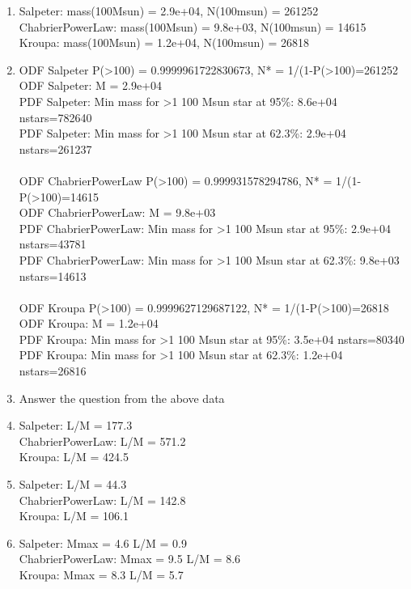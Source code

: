 \documentclass[twoside]{tufte-book} %
\begin{document}
\begin{enumerate}
\begin{enumerate}
\item %

Salpeter: mass(100Msun) = 2.9e+04, N(100msun) = 261252 \\ 
ChabrierPowerLaw: mass(100Msun) = 9.8e+03, N(100msun) = 14615 \\ 
Kroupa: mass(100Msun) = 1.2e+04, N(100msun) = 26818


\item %

ODF Salpeter P(>100) = 0.9999961722830673, N* = 1/(1-P(>100)=261252\\
ODF Salpeter: M = 2.9e+04\\
PDF Salpeter: Min mass for >1 100 Msun star at 95\%: 8.6e+04 nstars=782640\\
PDF Salpeter: Min mass for >1 100 Msun star at 62.3\%: 2.9e+04 nstars=261237\\
\\
ODF ChabrierPowerLaw P(>100) = 0.999931578294786, N* = 1/(1-P(>100)=14615\\
ODF ChabrierPowerLaw: M = 9.8e+03\\
PDF ChabrierPowerLaw: Min mass for >1 100 Msun star at 95\%: 2.9e+04 nstars=43781\\
PDF ChabrierPowerLaw: Min mass for >1 100 Msun star at 62.3\%: 9.8e+03 nstars=14613\\
\\
ODF Kroupa P(>100) = 0.9999627129687122, N* = 1/(1-P(>100)=26818\\
ODF Kroupa: M = 1.2e+04\\
PDF Kroupa: Min mass for >1 100 Msun star at 95\%: 3.5e+04 nstars=80340\\
PDF Kroupa: Min mass for >1 100 Msun star at 62.3\%: 1.2e+04 nstars=26816\\



\item Answer the question from the above data
\item %
    Salpeter: L/M = 177.3 \\
ChabrierPowerLaw: L/M = 571.2 \\
Kroupa: L/M = 424.5
\item %
    Salpeter: L/M = 44.3 \\
ChabrierPowerLaw: L/M = 142.8 \\
Kroupa: L/M = 106.1
\item %
Salpeter: Mmax = 4.6 L/M = 0.9 \\
ChabrierPowerLaw: Mmax = 9.5 L/M = 8.6 \\
Kroupa: Mmax = 8.3 L/M = 5.7
\end{enumerate}
\end{enumerate}
\end{document}
